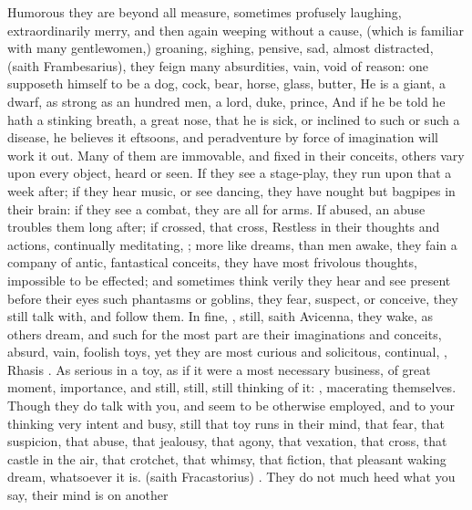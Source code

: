 {Humorous they are beyond all measure, sometimes profusely laughing,
extraordinarily merry, and then again weeping without a cause, (which is
familiar with many gentlewomen,) groaning, sighing, pensive, sad, almost
distracted,  (saith
Frambesarius), they feign many absurdities, vain, void of
reason: one supposeth himself to be a dog, cock, bear, horse, glass, butter,
\etc{} He is a giant, a dwarf, as strong as an hundred men, a lord, duke,
prince, \etc{} And if he be told he hath a stinking breath, a great nose, that
he is sick, or inclined to such or such a disease, he believes it eftsoons, and
peradventure by force of imagination will work it out. Many of them are
immovable, and fixed in their conceits, others vary upon every object, heard or
seen. If they see a stage-play, they run upon that a week after; if they hear
music, or see dancing, they have nought but bagpipes in their brain: if they
see a combat, they are all for arms. If abused, an abuse
troubles them long after; if crossed, that cross, \etc{} Restless in their
thoughts and actions, continually meditating, ; more like dreams, than men awake, they fain a company of
antic, fantastical conceits, they have most frivolous thoughts, impossible to
be effected; and sometimes think verily they hear and see present before their
eyes such phantasms or goblins, they fear, suspect, or conceive, they still
talk with, and follow them. In fine, , still, saith Avicenna, they wake, as
others dream, and such for the most part are their imaginations and conceits,
absurd, vain, foolish toys, yet they are
most curious and solicitous, continual, , Rhasis  . As serious in a toy, as if it were a most necessary business, of
great moment, importance, and still, still, still thinking of it: , macerating themselves. Though they do talk with you, and seem to be
otherwise employed, and to your thinking very intent and busy, still that toy
runs in their mind, that fear, that suspicion, that abuse, that jealousy, that
agony, that vexation, that cross, that castle in the air, that crotchet, that
whimsy, that fiction, that pleasant waking dream, whatsoever it is.  (saith Fracastorius) . They do not much heed what you say, their mind is on another
}
